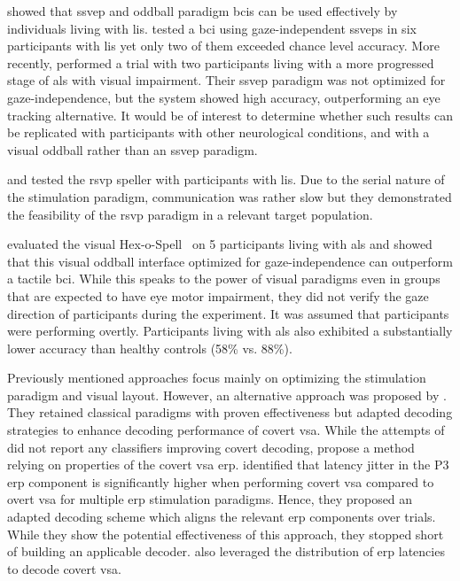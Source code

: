 \documentclass{article}
\begin{document}
\textcite{Combaz2013} showed that \ac{ssvep} and oddball paradigm \acp{bci} can
be used effectively by individuals living with \ac{lis}.
\textcite{Lesenfants2014} tested a \ac{bci} using gaze-independent \acp{ssvep} in six
participants with \ac{lis} yet only two of them exceeded chance level accuracy.
More recently, \textcite{Peters2020} performed a trial with two
participants living with a more progressed stage of \ac{als} with visual impairment.
Their \ac{ssvep} paradigm was not optimized for gaze-independence, but the
system showed high accuracy, outperforming an eye tracking alternative.
It would be of interest to determine whether such results can be replicated with
participants with other neurological conditions, and with a visual oddball rather
than an \ac{ssvep} paradigm.

\textcite{Orhan2012} and \textcite{Oken2014} tested the \ac{rsvp} speller with
participants with \ac{lis}. Due to the serial nature of the stimulation paradigm,
communication was rather slow but they demonstrated the feasibility of the \ac{rsvp}
paradigm in a relevant target population.

\textcite{Severens2014} evaluated the visual Hex-o-Spell~\cite{Treder2010} on 5
participants living with \ac{als} and showed that this visual oddball interface optimized
for gaze-independence can outperform a tactile \ac{bci}.
While this speaks to the power of visual paradigms even in groups that are
expected to have eye motor impairment, they did not verify the gaze direction
of participants during the experiment.
It was assumed that participants were performing overtly.
Participants living with \ac{als} also exhibited a substantially lower accuracy than healthy
controls (58\% vs. 88\%).

Previously mentioned approaches focus mainly on optimizing the stimulation
paradigm and visual layout.
However, an alternative approach was proposed by \textcite{Aloise2012}.
They retained classical paradigms with proven effectiveness but
adapted decoding strategies to enhance decoding performance of covert \ac{vsa}.
While the attempts of \textcite{Aloise2012} did not report any classifiers
improving covert decoding, \textcite{Arico2014} propose a method relying on
properties of the covert \ac{vsa} \ac{erp}.
\textcite{Arico2014} identified that latency jitter in the
P3 \ac{erp} component is significantly higher when performing covert \ac{vsa}
compared to overt \ac{vsa} for multiple \ac{erp} stimulation paradigms.
Hence, they proposed an adapted decoding scheme which aligns the
relevant \ac{erp} components over trials.
While they show the potential
effectiveness of this approach, they stopped short of building an applicable
decoder.
\textcite{Hardiansyah2020} also leveraged the distribution of \ac{erp} latencies
to decode covert \ac{vsa}.
\end{document}
